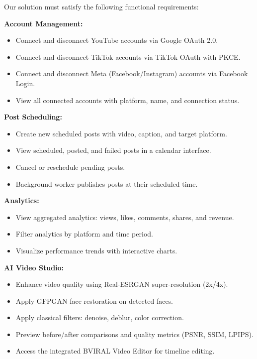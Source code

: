 Our solution must satisfy the following functional requirements:

\textbf{Account Management:}
\begin{itemize}
    \item Connect and disconnect YouTube accounts via Google OAuth 2.0.
    \item Connect and disconnect TikTok accounts via TikTok OAuth with PKCE.
    \item Connect and disconnect Meta (Facebook/Instagram) accounts via Facebook Login.
    \item View all connected accounts with platform, name, and connection status.
\end{itemize}

\textbf{Post Scheduling:}
\begin{itemize}
    \item Create new scheduled posts with video, caption, and target platform.
    \item View scheduled, posted, and failed posts in a calendar interface.
    \item Cancel or reschedule pending posts.
    \item Background worker publishes posts at their scheduled time.
\end{itemize}

\textbf{Analytics:}
\begin{itemize}
    \item View aggregated analytics: views, likes, comments, shares, and revenue.
    \item Filter analytics by platform and time period.
    \item Visualize performance trends with interactive charts.
\end{itemize}

\textbf{AI Video Studio:}
\begin{itemize}
    \item Enhance video quality using Real-ESRGAN super-resolution (2x/4x).
    \item Apply GFPGAN face restoration on detected faces.
    \item Apply classical filters: denoise, deblur, color correction.
    \item Preview before/after comparisons and quality metrics (PSNR, SSIM, LPIPS).
    \item Access the integrated BVIRAL Video Editor for timeline editing.
\end{itemize}

